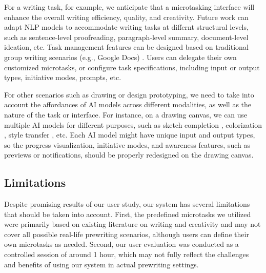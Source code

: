 For a writing task, for example, we anticipate that a microtasking interface will enhance the overall writing efficiency, quality, and creativity. Future work can adapt NLP models to accommodate writing tasks at differnt structural levels, such as sentence-level proofreading, paragraph-level summary, document-level ideation, etc. Task management features can be designed based on traditional group writing scenarios (e.g., Google Docs) \cite{birnholtz2012tracking,birnholtz2013write}. Users can delegate their own customized microtasks, or configure task specifications, including input or output types, initiative modes, prompts, etc.

For other scenarios such as drawing or design prototyping, we need to take into account the affordances of AI models across different modalities, as well as the nature of the task or interface.
For instance, on a drawing canvas, we can use multiple AI models for different purposes, such as sketch completion \cite{shi2020emog}, colorization \cite{yan2022flatmagic}, style transfer \cite{wu2023styleme}, etc. Each AI model might have unique input and output types, so the progress visualization, initiative modes, and awareness features, such as previews or notifications, should be properly redesigned on the drawing canvas.

\subsection{Limitations}
Despite promising results of our user study, our system has several limitations that should be taken into account.
First, the predefined microtasks we utilized were primarily based on existing literature on writing and creativity and may not cover all possible real-life prewriting scenarios, although users can define their own microtasks as needed. Second, our user evaluation was conducted as a controlled session of around 1 hour, which may not fully reflect the challenges and benefits of using our system in actual prewriting settings. %
